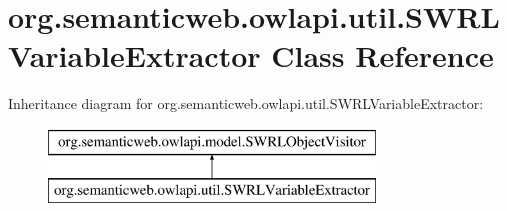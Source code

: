 \hypertarget{classorg_1_1semanticweb_1_1owlapi_1_1util_1_1_s_w_r_l_variable_extractor}{\section{org.\-semanticweb.\-owlapi.\-util.\-S\-W\-R\-L\-Variable\-Extractor Class Reference}
\label{classorg_1_1semanticweb_1_1owlapi_1_1util_1_1_s_w_r_l_variable_extractor}
}
Inheritance diagram for org.\-semanticweb.\-owlapi.\-util.\-S\-W\-R\-L\-Variable\-Extractor\-:\begin{figure}[H]
\begin{center}
\leavevmode
\includegraphics[height=2.000000cm]{classorg_1_1semanticweb_1_1owlapi_1_1util_1_1_s_w_r_l_variable_extractor}
\end{center}
\end{figure}
